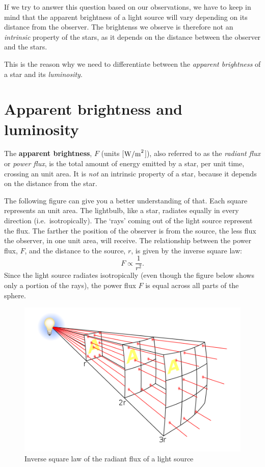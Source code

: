\documentclass[
  letterpaper,
  DIV=11,
  numbers=noendperiod]{scrreprt}
\begin{document}
If we try to answer this question based on our observations, we have to
keep in mind that the apparent brightness of a light source will vary
depending on its distance from the observer. The brightenss we observe
is therefore not an \emph{intrinsic} property of the stars, as it
depends on the distance between the observer and the stars.

This is the reason why we need to differentiate between the
\emph{apparent brightness} of a star and its \emph{luminosity}.

\hypertarget{apparent-brightness-and-luminosity}{%
\section{Apparent brightness and
luminosity}\label{apparent-brightness-and-luminosity}}

The \textbf{apparent brightness}, \(F\) (units {[}\(\rm{W/m}^2\){]}),
also referred to as the \emph{radiant flux} or \emph{power flux}, is the
total amount of energy emitted by a star, per unit time, crossing an
unit area. It is \emph{not} an intrinsic property of a star, because it
depends on the distance from the star.

The following figure can give you a better understanding of that. Each
square represents an unit area. The lightbulb, like a star, radiates
equally in every direction (i.e.~isotropically). The `rays' coming out
of the light source represent the flux. The farther the position of the
observer is from the source, the less flux the observer, in one unit
area, will receive. The relationship between the power flux, \(F\), and
the distance to the source, \(r\), is given by the inverse square law:
\[F\propto \dfrac{1}{r^2}.\] Since the light source radiates
isotropically (even though the figure below shows only a portion of the
rays), the power flux \(F\) is equal across all parts of the sphere.

\begin{figure}

{\centering \includegraphics{img/inverse_square_law.png}

}

\caption{Inverse square law of the radiant flux of a light source}

\end{figure}
\end{document}
